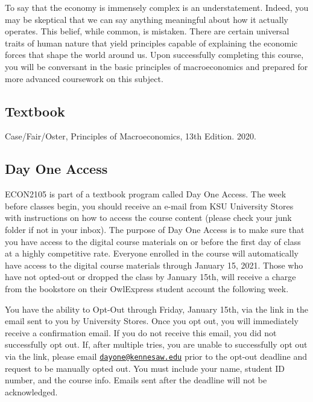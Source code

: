 \documentclass[11pt,]{article}
\begin{document}
To say that the economy is immensely complex is an understatement. Indeed, you may be skeptical that we can say anything meaningful about how it actually operates. This belief, while common, is mistaken.
There are certain universal traits of human nature that yield principles capable of explaining the economic
forces that shape the world around us. Upon successfully completing this course, you will be conversant in the basic principles of macroeconomics and prepared for more advanced coursework on this subject.

\hypertarget{textbook}{%
\subsection{Textbook}\label{textbook}}

Case/Fair/Oster, Principles of Macroeconomics, 13th Edition. 2020.

\hypertarget{day-one-access}{%
\subsection*{Day One Access}\label{day-one-access}}

ECON2105 is part of a textbook program called Day One Access. The week before
classes begin, you should receive an e-mail from KSU University Stores with instructions on how
to access the course content (please check your junk folder if not in your inbox). The purpose of
Day One Access is to make sure that you have access to the digital course materials on or before
the first day of class at a highly competitive rate. Everyone enrolled in the course will
automatically have access to the digital course materials through January 15, 2021. Those who
have not opted-out or dropped the class by January 15th, will receive a charge from the
bookstore on their OwlExpress student account the following week.

You have the ability to Opt-Out through Friday, January 15th, via the link in the email sent to you
by University Stores. Once you opt out, you will immediately receive a confirmation email. If you
do not receive this email, you did not successfully opt out. If, after multiple tries, you are unable
to successfully opt out via the link, please email \href{mailto:dayone@kennesaw.edu}{\nolinkurl{dayone@kennesaw.edu}} prior to the opt-out
deadline and request to be manually opted out. You must include your name, student ID number,
and the course info. Emails sent after the deadline will not be acknowledged.
\end{document}
